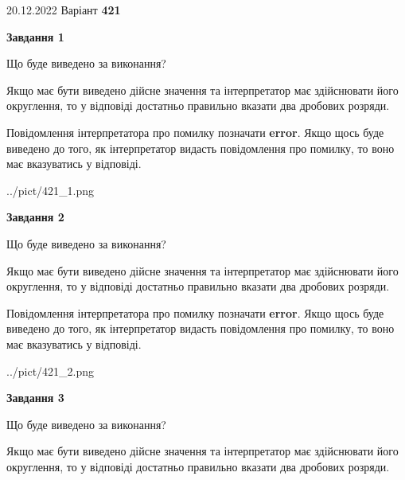 \documentclass[12pt, ukrainian]{article}
\begin{document}
{20.12.2022 Варіант \No \textbf { 421 }\par}
{
\begin {Large}

{\begin {center}\textbf{Завдання 1}\end {center}}\par
Що буде виведено за виконання? \par

Якщо має бути виведено дійсне значення та інтерпретатор має здійснювати його округлення, 
то у відповіді достатньо правильно вказати два дробових розряди.

Повідомлення інтерпретатора про помилку позначати \textbf{error}.
Якщо щось буде виведено до того, як інтерпретатор видасть повідомлення про помилку, 
то воно має вказуватись у відповіді. \par

\begin{center}
	{../pict/421_1.png}
\end{center}
\newpage

{\begin {center}\textbf{Завдання 2}\end {center}}\par
Що буде виведено за виконання? \par

Якщо має бути виведено дійсне значення та інтерпретатор має здійснювати його округлення, 
то у відповіді достатньо правильно вказати два дробових розряди.

Повідомлення інтерпретатора про помилку позначати \textbf{error}.
Якщо щось буде виведено до того, як інтерпретатор видасть повідомлення про помилку, 
то воно має вказуватись у відповіді. \par

\begin{center}
	{../pict/421_2.png}
\end{center}
\newpage

{\begin {center}\textbf{Завдання 3}\end {center}}\par
Що буде виведено за виконання? \par

Якщо має бути виведено дійсне значення та інтерпретатор має здійснювати його округлення, 
то у відповіді достатньо правильно вказати два дробових розряди.


\end{Large}}
\end{document}
